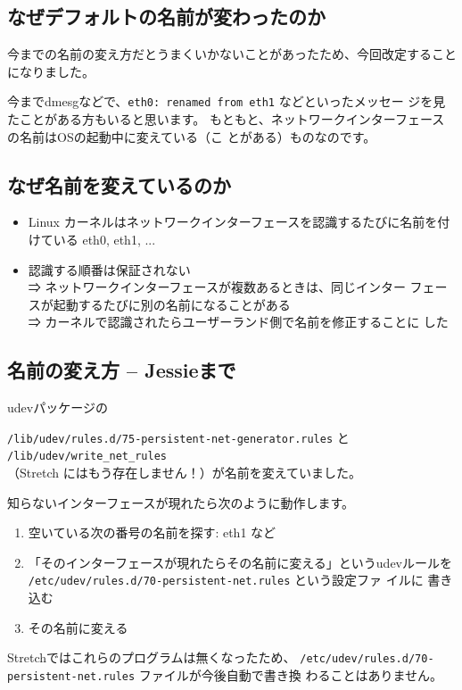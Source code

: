 \documentclass[mingoth,a4paper]{jsarticle}
\begin{document}
\subsection{なぜデフォルトの名前が変わったのか}
今までの名前の変え方だとうまくいかないことがあったため、今回改定すること
になりました。

今までdmesgなどで、\texttt{eth0: renamed from eth1} などといったメッセー
ジを見たことがある方もいると思います。
もともと、ネットワークインターフェースの名前はOSの起動中に変えている（こ
とがある）ものなのです。

\subsection{なぜ名前を変えているのか}
 \begin{itemize}
  \item Linux カーネルはネットワークインターフェースを認識するたびに名前を付
	けている eth0, eth1, ...
  \item 認識する順番は保証されない\\
	⇒ ネットワークインターフェースが複数あるときは、同じインター
	フェースが起動するたびに別の名前になることがある\\
	⇒ カーネルで認識されたらユーザーランド側で名前を修正することに
	した
 \end{itemize}

\subsection{名前の変え方 -- Jessieまで}
 udevパッケージの

 \texttt{/lib/udev/rules.d/75-persistent-net-generator.rules} と
 \texttt{/lib/udev/write\_net\_rules}\\
 （Stretch にはもう存在しません！）が名前を変えていました。

 知らないインターフェースが現れたら次のように動作します。
 \begin{enumerate}
  \item 空いている次の番号の名前を探す: eth1 など
  \item 「そのインターフェースが現れたらその名前に変える」というudevルールを\\
	\texttt{/etc/udev/rules.d/70-persistent-net.rules} という設定ファ
	イルに
	書き込む
  \item その名前に変える
 \end{enumerate}

 Stretchではこれらのプログラムは無くなったため、
\texttt{/etc/udev/rules.d/70-persistent-net.rules} ファイルが今後自動で書き換
 わることはありません。
\end{document}
